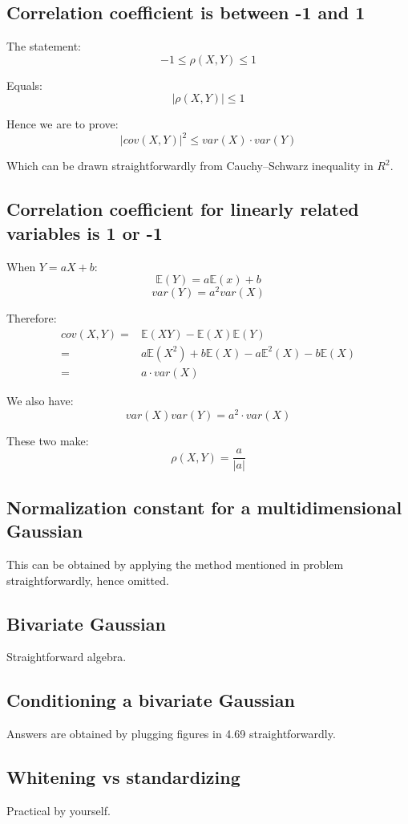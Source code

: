 \documentclass[UTF8]{ctexart}
\begin{document}
\subsection{Correlation coefficient is between -1 and 1}
The statement:
$$-1 \leq \rho(X,Y) \leq 1$$

Equals:
$$|\rho(X,Y)| \leq 1$$

Hence we are to prove:
$$|cov(X,Y)|^{2} \leq var(X)\cdot var(Y)$$

Which can be drawn straightforwardly from Cauchy–Schwarz inequality in $R^{2}$.

\subsection{Correlation coefficient for linearly related variables is 1 or -1}
When $Y=aX+b$:
$$\mathbb{E}(Y)=a\mathbb{E}(x)+b$$
$$var(Y)=a^{2}var(X)$$

Therefore:
\begin{align}
cov(X,Y)=&\mathbb{E}(XY)-\mathbb{E}(X)\mathbb{E}(Y)\nonumber \\
=&a\mathbb{E}(X^{2})+b\mathbb{E}(X)-a\mathbb{E}^{2}(X)-b\mathbb{E}(X)\nonumber \\
=&a\cdot var(X) \nonumber
\end{align}

We also have:
$$var(X)var(Y) = a^{2}\cdot var(X)$$

These two make:
$$\rho(X,Y) = \frac{a}{|a|}$$

\subsection{Normalization constant for a multidimensional Gaussian}
This can be obtained by applying the method mentioned in problem straightforwardly, hence omitted.

\subsection{Bivariate Gaussian}
Straightforward algebra.

\subsection{Conditioning a bivariate Gaussian}
Answers are obtained by plugging figures in 4.69 straightforwardly.

\subsection{Whitening vs standardizing}
Practical by yourself.
\end{document}
